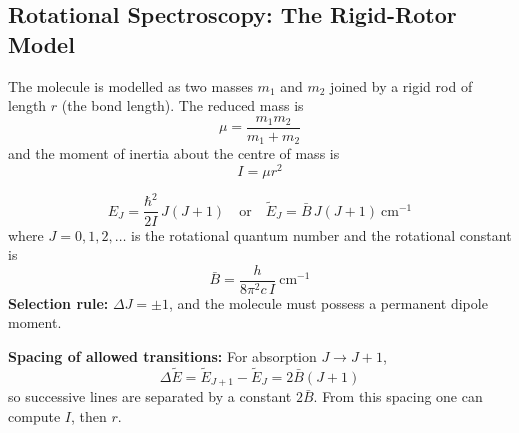 \documentclass[12pt,a4paper]{article}
\begin{document}
\subsection{Rotational Spectroscopy: The Rigid-Rotor Model}
The molecule is modelled as two masses $m_1$ and $m_2$ joined by a rigid rod of length $r$ (the bond length). The reduced mass is
\[
\mu=\frac{m_1 m_2}{m_1+m_2}
\]
and the moment of inertia about the centre of mass is
\[
I=\mu r^{2}
\]

\begin{tcolorbox}[formulabox, title={Rotational Energy Levels (Rigid Rotor)}]
\[
E_J = \frac{\hbar^{2}}{2I}\,J(J+1) \quad\text{or}\quad \tilde{E}_J=\bar{B}\,J(J+1)\ \mathrm{cm^{-1}}
\]
where $J=0,1,2,\ldots$ is the rotational quantum number and the rotational constant is
\[
\bar{B}=\frac{h}{8\pi^{2} c\, I}\ \mathrm{cm^{-1}}
\]
\textbf{Selection rule:} $\Delta J=\pm 1$, and the molecule must possess a permanent dipole moment.
\end{tcolorbox}

\textbf{Spacing of allowed transitions:} For absorption $J\to J+1$,
\[
\Delta\tilde{E}=\tilde{E}_{J+1}-\tilde{E}_{J}=2\bar{B}(J+1)
\]
so successive lines are separated by a constant $2\bar{B}$. From this spacing one can compute $I$, then $r$.

\begin{tcolorbox}[tikzbox, title={Rotational Energy Levels and Spectrum}]
\centering
{}
\end{tcolorbox}
\end{document}
